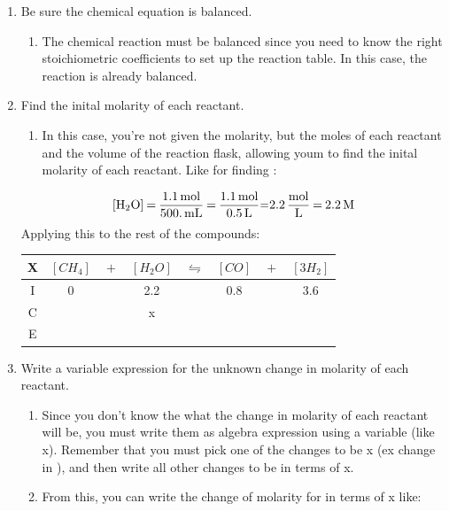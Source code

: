 \documentclass{article}  %
\begin{document}
\begin{enumerate}
    \item Be sure the chemical equation is balanced. 
        \begin{enumerate}
            \item The chemical reaction must be balanced since you need to know the right stoichiometric coefficients to set up the reaction table. In this case, the reaction is already balanced. 
        \end{enumerate}
    \item Find the inital molarity of each reactant. 
        \begin{enumerate}
            \item In this case, you're not given the molarity, but the moles of each reactant and the volume of the reaction flask, allowing youm to find the inital molarity of each reactant. Like for finding :
        \end{enumerate}
    \begin{equation*}
        \begin{aligned}
            \ce{[H2O] = \frac{1.1mol}{500.mL} = \frac{1.1mol}{0.5L}=2.2\frac{mol}{L} = 2.2M}
        \end{aligned}
    \end{equation*}
    Applying this to the rest of the compounds: \\
    \begin{tabular}{c|c@{}c@{}c@{}c@{}c@{}c@{}c}
        \hline
        X   & $[CH_4]$ & ${}+{}$ & $[H_2O]$ & ${}\leftrightharpoons{}$ & $[CO]$ & ${}+{}$ & $[3H_2]$ \\
        \hline
        I   &  0    && 2.2    &&  0.8   && 3.6  \\
        C   &      &&  x   &&     &&   \\
        E   &      &&     &&     &&   \\      
    \end{tabular}
    \item Write a variable expression for the unknown change in molarity of each reactant. 
        \begin{enumerate}
            \item Since you don't know the what the change in molarity of each reactant will be, you must write them as algebra expression using a variable (like x). Remember that you must pick one of the changes to be x (ex change in ), and then write all other changes to be in terms of x.
            \item From this, you can write the change of molarity for  in terms of x like:

\end{enumerate}
\end{enumerate}
\end{document}
